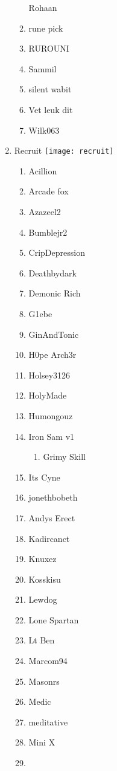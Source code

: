\documentclass{article}
\begin{document}
\begin{enumerate}[I]
\begin{enumerate}[I]
	Rohaan
      \item
	rune pick
      \item
	RUROUNI
      \item
	Sammil
      \item
	silent wabit
      \item
	Vet leuk dit
      \item
	Wilk063
    \end{enumerate}
  \item
    Recruit \texttt{[image: recruit]}
    \begin{enumerate}[I]
      \item 
	Acillion
      \item
	Arcade fox
      \item
	Azazeel2
      \item
	Bumblejr2
      \item
	CripDepression
      \item
	Deathbydark
      \item
	Demonic Rich
      \item
	G1ebe
      \item
	GinAndTonic
      \item
	H0pe Arch3r
      \item
	Holsey3126
      \item
	HolyMade
      \item
	Humongouz
      \item
	Iron Sam v1
	  \begin{enumerate}[I]
	    \item
	      Grimy Skill
	  \end{enumerate}
      \item
	Its Cyne
      \item
	jonethbobeth
      \item
	Andys Erect
      \item
	Kadircanct
      \item
	Knuxez
      \item
	Kosskisu
      \item
	Lewdog
      \item
	Lone Spartan
      \item
	Lt Ben
      \item
	Marcom94
      \item
	Masonrs
      \item
	Medic
      \item
	meditative
      \item
	Mini X
      \item

\end{enumerate}
\end{enumerate}
\end{document}
